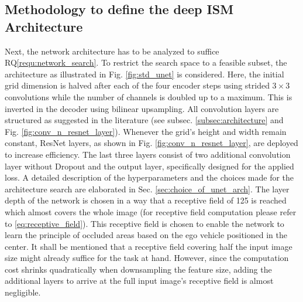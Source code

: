 \subsection{Methodology to define the deep ISM Architecture}
\label{subsec:method_deep_ism_architecture}
Next, the network architecture has to be analyzed to suffice RQ\ref{requ:network_search}. To restrict the search space to a feasible subset, the architecture as illustrated in Fig. \ref{fig:std_unet} is considered. Here, the initial grid dimension is halved after each of the four encoder steps using strided $3\times 3$ convolutions while the number of channels is doubled up to a maximum. This is inverted in the decoder using bilinear upsampling. All convolution layers are structured as suggested in the literature (see subsec. \ref{subsec:architecture} and Fig. \ref{fig:conv_n_resnet_layer}). Whenever the grid's height and width remain constant, ResNet layers, as shown in Fig. \ref{fig:conv_n_resnet_layer}, are deployed to increase efficiency. The last three layers consist of two additional convolution layer without Dropout and the output layer, specifically designed for the applied loss. A detailed description of the hyperparameters and the choices made for the architecture search are elaborated in Sec. \ref{sec:choice_of_unet_arch}. The layer depth of the network is chosen in a way that a receptive field of 125 is reached which almost covers the whole image (for receptive field computation please refer to \eqref{eq:receptive_field}). This receptive field is chosen to enable the network to learn the principle of occluded areas based on the ego vehicle positioned in the center. It shall be mentioned that a receptive field covering half the input image size might already suffice for the task at hand. However, since the computation cost shrinks quadratically when downsampling the feature size, adding the additional layers to arrive at the full input image's receptive field is almost negligible. 
